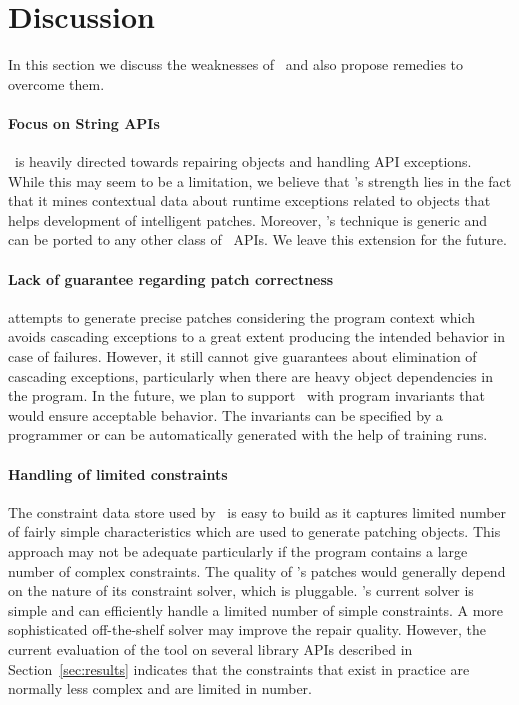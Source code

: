 \section{Discussion}
\label{sec:discussion}

In this section we discuss the weaknesses of \tool\ and also propose
remedies to overcome them.

\paragraph{Focus on String APIs} \tool\ is heavily directed towards repairing 
  objects and handling API
exceptions. While this may seem to be a limitation, we believe that \tool's
strength lies in the fact that it mines contextual data about runtime exceptions
related to  objects that helps development of intelligent patches.
Moreover, \tool's technique is generic and can be ported to any other class of
\java\ APIs. We leave this extension for the future.

\paragraph{Lack of guarantee regarding patch correctness} \tool attempts to generate 
precise patches considering the program context which avoids
cascading exceptions to a great extent producing the intended behavior in case
of failures. However, it still cannot give guarantees about elimination of cascading
exceptions, particularly when there are heavy object dependencies in the program.
In the future, we plan to support \tool\ with program invariants that would ensure 
acceptable behavior. The invariants can be specified by a programmer or can be
automatically generated with the help of training runs.

\paragraph{Handling of limited constraints} The constraint data store used by \tool\
is easy to build as it captures
limited number of fairly simple  characteristics which are used to
generate patching \code{String} objects. This approach may not be adequate particularly
if the program contains a large number of complex constraints. The quality of
\tool's patches would generally depend on the nature of its constraint solver,
which is pluggable. \tool's current solver is simple and can efficiently
handle a limited number of simple constraints. A more sophisticated off-the-shelf solver may improve
the repair quality. However, the current evaluation of the tool
on several library APIs described in Section~\ref{sec:results} indicates that the constraints that exist
in practice are normally less complex and are limited in number. \note{Please check this section.}


